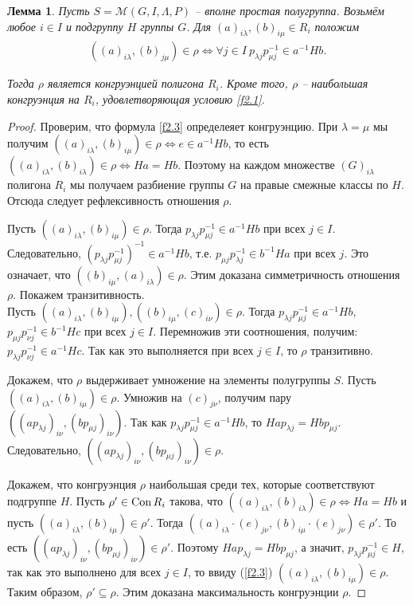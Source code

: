 \documentclass[a4paper]{article}
\newtheorem{lemma}{Лемма}
\newcommand{\Con}{\textnormal{Con}\, }
\begin{document}
	\begin{lemma} \label{l2.5}
		Пусть $S = \mathcal{M}(G,I,\Lambda,P)$ -- вполне простая полугруппа. Возьмём любое $i \in I$ и подгруппу $H$ группы $G$. Для $(a)_{i \lambda},(b)_{i \mu} \in R_i$ положим
		\begin{gather}
			((a)_{i \lambda},(b)_{j \mu}) \in \rho \Leftrightarrow \forall j \in I \ p_{\lambda j} p_{\mu j}^{-1} \in a^{-1} H b. \label{f2.3}
		\end{gather}
		\par Тогда $\rho$ является конгруэнцией полигона $R_i$. Кроме того, $\rho$ -- наибольшая конгруэнция на $R_i$, удовлетворяющая условию \ref{f2.1}.
	\end{lemma}
	\begin{proof}
		Проверим, что формула \ref{f2.3} определеяет конгруэнцию. При $\lambda = \mu$ мы получим $((a)_{i \lambda},(b)_{i \mu}) \in \rho \Leftrightarrow e \in a^{-1} H b$, то есть $((a)_{i \lambda},(b)_{i \lambda}) \in \rho \Leftrightarrow H a = H b$. Поэтому на каждом множестве $(G)_{i \lambda}$ полигона $R_i$ мы получаем разбиение группы $G$ на правые смежные классы по $H$. Отсюда следует рефлексивность отношения $\rho$.
		\par Пусть $((a)_{i \lambda},(b)_{i \mu}) \in \rho$. Тогда $p_{\lambda j} p_{\mu j}^{-1} \in a^{-1} H b$ при всех $j \in I$. Следовательно, $(p_{\lambda j} p_{\mu j}^{-1})^{-1} \in a^{-1} H b$, т.е. $p_{\mu j} p_{\lambda j}^{-1} \in b^{-1} H a$ при всех $j$. Это означает, что $((b)_{i \mu},(a)_{i \lambda}) \in \rho$. Этим доказана симметричность отношения $\rho$. Покажем транзитивность.\\
		Пусть $((a)_{i \lambda},(b)_{i \mu}),((b)_{i \mu},(c)_{i \nu}) \in \rho$. Тогда $p_{\lambda j} p_{\mu j}^{-1} \in a^{-1} H b$, $p_{\mu j} p_{\nu j}^{-1} \in b^{-1} H c$ при всех $j \in I$. Перемножив эти соотношения, получим: $p_{\lambda j} p_{\nu j}^{-1} \in a^{-1} H c$. Так как это выполняется при всех $j \in I$, то $\rho$ транзитивно.
		\par Докажем, что $\rho$ выдерживает умножение на элементы полугруппы $S$. Пусть $((a)_{i \lambda},(b)_{i \mu}) \in \rho$. Умножив на $(c)_{j \nu}$, получим пару $((ap_{\lambda j})_{i \nu},(bp_{\mu j})_{i \nu})$. Так как $p_{\lambda j} p_{\mu j}^{-1} \in a^{-1} H b$, то $H a p_{\lambda j} = H b p_{\mu j}$. Следовательно, $((a p_{\lambda j})_{i \nu},(b p_{\mu j})_{i \nu}) \in \rho$.
		\par Докажем, что конгруэнция $\rho$ наибольшая среди тех, которые соответствуют подгруппе $H$. Пусть $\rho' \in \Con R_i$ такова, что $((a)_{i \lambda},(b)_{i \lambda}) \in \rho \Leftrightarrow H a = H b$ и пусть $((a)_{i \lambda},(b)_{i \mu}) \in \rho'$. Тогда $((a)_{i \lambda} \cdot (e)_{j \nu},(b)_{i \mu} \cdot (e)_{j \nu}) \in \rho'$. То есть $((a p_{\lambda j})_{i \nu},(b p_{\mu j})_{i \nu}) \in \rho'$. Поэтому $H a p_{\lambda j} = H b p_{\mu j}$, а значит, $p_{\lambda j} p_{\mu j}^{-1} \in H$, так как это выполнено для всех $j \in I$, то ввиду (\ref{f2.3}) $((a)_{i \lambda},(b)_{i \mu}) \in \rho$. Таким образом, $\rho' \subseteq \rho$. Этим доказана максимальность конгруэнции $\rho$.
	\end{proof}
	
\end{document}

